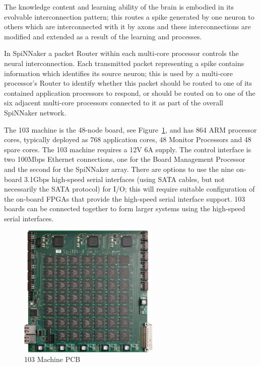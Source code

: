 The knowledge content and learning ability of the brain is embodied in its evolvable interconnection pattern; 
this routes a spike generated by one neuron to others which are interconnected with it by axons and these interconnections are modified and extended as a result of the learning and processes.

In SpiNNaker a packet Router within each multi-core processor controls the neural interconnection. 
Each transmitted packet representing a spike contains information which identifies its source neuron; 
this is used by a multi-core processor's Router to identify whether this packet should be routed to one of its contained application processors to respond, or should be routed on to one of the six adjacent multi-core processors connected to it as part of the overall SpiNNaker network.

The 103 machine is the 48-node board, see Figure~\ref{fig:48node}, and has 864 ARM processor cores, typically deployed as 768 application cores, 48 Monitor Processors and 48 spare cores. The 103 machine requires a 12V 6A supply. 
The control interface is two 100Mbps Ethernet connections, one for the Board Management Processor and the second for the SpiNNaker array. 
There are options to use the nine on-board 3.1Gbps high-speed serial interfaces (using SATA cables, but not necessarily the SATA protocol) for I/O; 
this will require suitable configuration of the on-board FPGAs that provide the high-speed serial interface support. 
103 boards can be connected together to form larger systems using the high-speed serial interfaces. 

\begin{figure}
\centering
	\includegraphics[width=0.6\textwidth]{pics/48node_pcb_resolution-white.pdf}
	\caption{103 Machine PCB}
	\label{fig:48node}
\end{figure}


